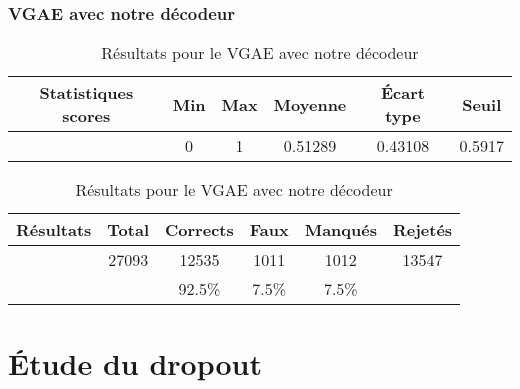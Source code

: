 \documentclass{article}
\begin{document}
\subsubsection{VGAE avec notre décodeur}

\begin{table}
    \centering
    \begin{tabular}{|c|c|c|c|c|c|}
        \hline
        Statistiques scores & Min & Max & Moyenne & Écart type & Seuil\\
        \hline
         & 0 & 1 & 0.51289 & 0.43108 & 0.5917 \\
         \hline
    \end{tabular}
    \begin{tabular}{|c|c|c|c|c|c|}
        \hline
        Résultats & Total & Corrects & Faux & Manqués & Rejetés\\
        \hline
         & 27093 & 12535 & 1011 & 1012 & 13547\\
        \hline
         &  & 92.5\% & 7.5\% & 7.5\% & \\
        \hline
    \end{tabular}
    \caption{Résultats pour le VGAE avec notre décodeur}
    \label{tab:my_label}
\end{table}


\section{Étude du dropout}
\end{document}
